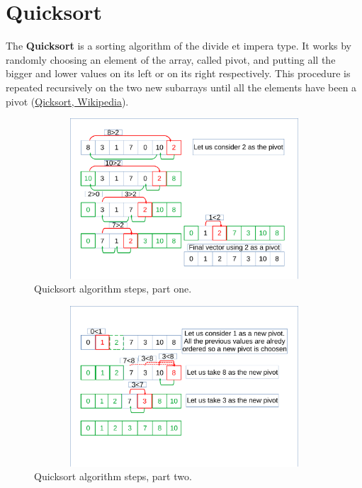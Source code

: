 \section{Quicksort}
The \textbf{Quicksort} is a sorting algorithm of the divide et impera type. It works by randomly choosing an element of the array, called pivot, and putting all the bigger and lower values on its left or on its right respectively. This procedure is repeated recursively on the two new subarrays until all the elements have been a pivot \cite{wikiqicksort} (\href{https://en.wikipedia.org/wiki/Quicksort}{Qicksort, Wikipedia}). 
\begin{figure}[hb]
	\includegraphics[width=14cm,height=6cm]{chapters/searchandsorting/images/sorting_8.pdf}
	\caption[]{Quicksort algorithm steps, part one.}
	\label{sorting_8}
\end{figure}

\begin{figure}[hb]
	\includegraphics[width=14cm,height=6cm]{chapters/searchandsorting/images/sorting_9.pdf}
	\caption[]{Quicksort algorithm steps, part two.}
	\label{sorting_9}
\end{figure}

